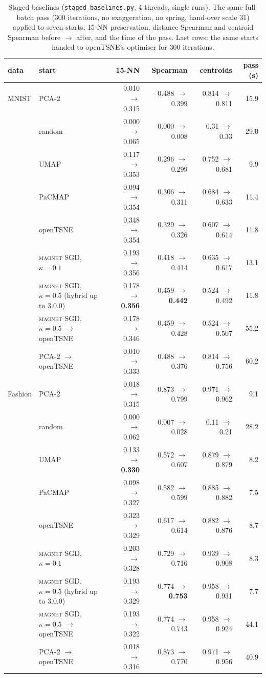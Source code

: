 \documentclass[11pt]{article}
\newcommand{\magnet}{\textsc{magnet}}
\begin{document}
\begin{table}[t]
\centering\small
\caption{Staged baselines (\texttt{staged\_baselines.py}, 4 threads, single runs). The same full-batch
pass (300 iterations, no exaggeration, no spring, hand-over scale 31) applied to seven starts; 15-NN
preservation, distance Spearman and centroid Spearman before $\to$ after, and the time of the pass. Last
rows: the same starts handed to openTSNE's optimiser for 300 iterations.}
\label{tab:staged}
\footnotesize
\begin{tabular}{llrrrr}
\toprule
data & start & 15-NN & Spearman & centroids & pass (s) \\
\midrule
MNIST & PCA-2 & 0.010 $\to$ 0.315 & 0.488 $\to$ 0.399 & 0.814 $\to$ 0.811 & 15.9 \\
 & random & 0.000 $\to$ 0.065 & 0.000 $\to$ 0.008 & 0.31 $\to$ 0.33 & 29.0 \\
 & UMAP & 0.117 $\to$ 0.353 & 0.296 $\to$ 0.299 & 0.752 $\to$ 0.681 & 9.9 \\
 & PaCMAP & 0.094 $\to$ 0.354 & 0.306 $\to$ 0.311 & 0.684 $\to$ 0.633 & 11.4 \\
 & openTSNE & 0.348 $\to$ 0.354 & 0.329 $\to$ 0.326 & 0.607 $\to$ 0.614 & 11.8 \\
 & \magnet{} SGD, $\kappa = 0.1$ & 0.193 $\to$ 0.356 & 0.418 $\to$ 0.414 & 0.635 $\to$ 0.617 & 13.1 \\
 & \magnet{} SGD, $\kappa = 0.5$ (hybrid up to 3.0.0) & 0.178 $\to$ \textbf{0.356} & 0.459 $\to$ \textbf{0.442} & 0.524 $\to$ 0.492 & 11.8 \\
 & \magnet{} SGD, $\kappa = 0.5$ $\to$ openTSNE & 0.178 $\to$ 0.346 & 0.459 $\to$ 0.428 & 0.524 $\to$ 0.507 & 55.2 \\
 & PCA-2 $\to$ openTSNE & 0.010 $\to$ 0.333 & 0.488 $\to$ 0.376 & 0.814 $\to$ 0.756 & 60.2 \\
\midrule
Fashion & PCA-2 & 0.018 $\to$ 0.315 & 0.873 $\to$ 0.799 & 0.971 $\to$ 0.962 & 9.1 \\
 & random & 0.000 $\to$ 0.062 & 0.007 $\to$ 0.028 & 0.11 $\to$ 0.21 & 28.2 \\
 & UMAP & 0.133 $\to$ \textbf{0.330} & 0.572 $\to$ 0.607 & 0.879 $\to$ 0.879 & 8.2 \\
 & PaCMAP & 0.098 $\to$ 0.327 & 0.582 $\to$ 0.599 & 0.885 $\to$ 0.882 & 7.5 \\
 & openTSNE & 0.323 $\to$ 0.329 & 0.617 $\to$ 0.614 & 0.882 $\to$ 0.876 & 8.7 \\
 & \magnet{} SGD, $\kappa = 0.1$ & 0.203 $\to$ 0.328 & 0.729 $\to$ 0.716 & 0.939 $\to$ 0.908 & 8.3 \\
 & \magnet{} SGD, $\kappa = 0.5$ (hybrid up to 3.0.0) & 0.193 $\to$ 0.329 & 0.774 $\to$ \textbf{0.753} & 0.958 $\to$ 0.931 & 7.7 \\
 & \magnet{} SGD, $\kappa = 0.5$ $\to$ openTSNE & 0.193 $\to$ 0.322 & 0.774 $\to$ 0.743 & 0.958 $\to$ 0.924 & 44.1 \\
 & PCA-2 $\to$ openTSNE & 0.018 $\to$ 0.316 & 0.873 $\to$ 0.770 & 0.971 $\to$ 0.956 & 40.9 \\
\bottomrule
\end{tabular}
\end{table}
\end{document}
